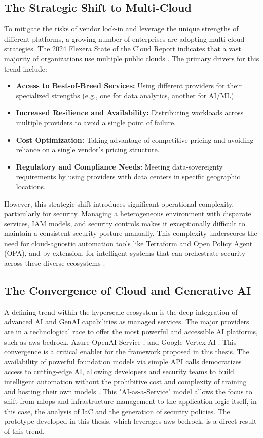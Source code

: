 \subsection{The Strategic Shift to Multi-Cloud}
To mitigate the risks of vendor lock-in and leverage the unique strengths of different platforms, a growing number of enterprises are adopting \gls{multi-cloud} strategies. The 2024 Flexera State of the Cloud Report indicates that a vast majority of organizations use multiple public clouds \cite{flexera_flexera_2024}. The primary drivers for this trend include:
\begin{itemize}
    \item \textbf{Access to Best-of-Breed Services:} Using different providers for their specialized strengths (e.g., one for data analytics, another for AI/ML).
    \item \textbf{Increased Resilience and Availability:} Distributing workloads across multiple providers to avoid a single point of failure.
    \item \textbf{Cost Optimization:} Taking advantage of competitive pricing and avoiding reliance on a single vendor's pricing structure.
    \item \textbf{Regulatory and Compliance Needs:} Meeting \gls{data-sovereignty} requirements by using providers with data centers in specific geographic locations.
\end{itemize}
However, this strategic shift introduces significant operational complexity, particularly for security. Managing a heterogeneous environment with disparate services, IAM models, and security controls makes it exceptionally difficult to maintain a consistent \gls{security-posture} manually. This complexity underscores the need for cloud-agnostic automation tools like Terraform and Open Policy Agent (OPA), and by extension, for intelligent systems that can orchestrate security across these diverse ecosystems \cite{dasari_infrastructure_2025}.

\subsection{The Convergence of Cloud and Generative AI}
A defining trend within the \gls{hyperscale} ecosystem is the deep integration of advanced AI and GenAI capabilities as managed services. The major providers are in a technological race to offer the most powerful and accessible AI platforms, such as \gls{aws-bedrock}\cite{noauthor_claude_nodate}, Azure OpenAI Service \cite{microsoft_what_2024}, and Google Vertex AI \cite{noauthor_ground_nodate}. This convergence is a critical enabler for the framework proposed in this thesis. The availability of powerful foundation models via simple API calls democratizes access to cutting-edge AI, allowing developers and security teams to build intelligent automation without the prohibitive cost and complexity of training and hosting their own models \cite{seth_ai_2025-1}. This "AI-as-a-Service" model allows the focus to shift from \gls{mlops} and infrastructure management to the application logic itself, in this case, the analysis of IaC and the generation of security policies. The prototype developed in this thesis, which leverages \gls{aws-bedrock}, is a direct result of this trend.

